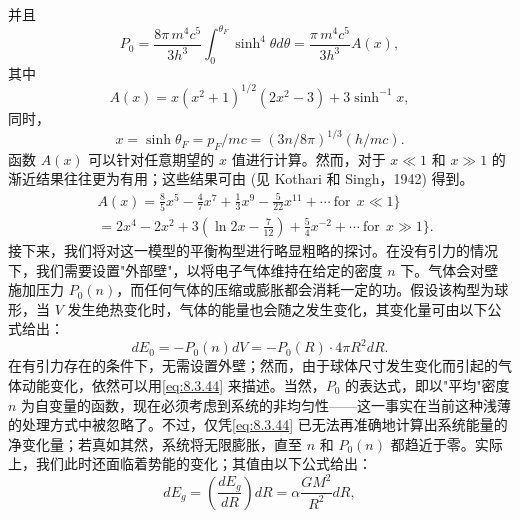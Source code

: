 并且
\begin{equation}\tag{8.3.40}\label{eq:8.3.40}
P _ { 0 } = \frac { 8 \pi \, m ^{4} c ^{5} } { 3 h ^{3} } \int _ { 0 } ^{\theta _ { F} } \sinh ^{4} \theta d \theta = \frac { \pi \, m ^{4} c ^{5} } { 3 h ^{3} } A ( x ) ,
\end{equation}
其中
\begin{equation}\tag{8.3.41}\label{eq:8.3.41}
A ( x ) = x ( x ^{2} + 1 ) ^{1 / 2} ( 2 x ^{2} - 3 ) + 3 \sinh ^{- 1} x ,
\end{equation}
同时，
\begin{equation}\tag{8.3.42}\label{eq:8.3.42}
x = \sinh \theta _ { F } = p _ { F } / m c = ( 3 n / 8 \pi ) ^{1 / 3} ( h / m c ) .
\end{equation}
函数 \(A(x)\) 可以针对任意期望的 \(x\) 值进行计算。然而，对于 \(x \ll 1\) 和 \(x \gg 1\) 的渐近结果往往更为有用；这些结果可由 (见 Kothari 和 Singh，1942) 得到。
\begin{equation}\tag{8.3.43}\label{eq:8.3.43}
\begin{array}{rl} & { A ( x ) = \frac { 8 } { 5 } x ^{5} - \frac { 4 } { 7 } x ^{7} + \frac { 1 } { 3 } x ^{9} - \frac { 5 } { 22 } x ^{11} + \cdots  \mathrm { ~ f o r ~ } \ x \ll 1 \Bigg \} } \\& { = 2 x ^{4} - 2 x ^{2} + 3 ( \ln 2 x - \frac { 7 } { 12 } ) + \frac { 5 } { 4 } x ^{- 2} + \cdots  \mathrm { ~ f o r ~ } \ x \gg 1 \Bigg \} . } \end{array}
\end{equation}
接下来，我们将对这一模型的平衡构型进行略显粗略的探讨。在没有引力的情况下，我们需要设置"外部壁"，以将电子气体维持在给定的密度 \(n\) 下。气体会对壁施加压力 \(P_0(n)\)，而任何气体的压缩或膨胀都会消耗一定的功。假设该构型为球形，当 \(V\) 发生绝热变化时，气体的能量也会随之发生变化，其变化量可由以下公式给出：
\begin{equation}\tag{8.3.44}\label{eq:8.3.44}
d E _ { 0 } = - P _ { 0 } ( n ) d V = - P _ { 0 } ( R ) \cdot 4 \pi R ^{2} d R .
\end{equation}
在有引力存在的条件下，无需设置外壁；然而，由于球体尺寸发生变化而引起的气体动能变化，依然可以用\autoref{eq:8.3.44} 来描述。当然，\(P_{0}\) 的表达式，即以"平均"密度 \(n\) 为自变量的函数，现在必须考虑到系统的非均匀性——这一事实在当前这种浅薄的处理方式中被忽略了。不过，仅凭\autoref{eq:8.3.44} 已无法再准确地计算出系统能量的净变化量；若真如其然，系统将无限膨胀，直至 \(n\) 和 \(P_{0}(n)\) 都趋近于零。实际上，我们此时还面临着势能的变化；其值由以下公式给出：
\begin{equation}\tag{8.3.45}\label{eq:8.3.45}
d E _ { g } = \left( \frac { d E _ { g } } { d R } \right) d R = \alpha \frac { G M ^{2} } { R ^{2} } d R ,
\end{equation}
